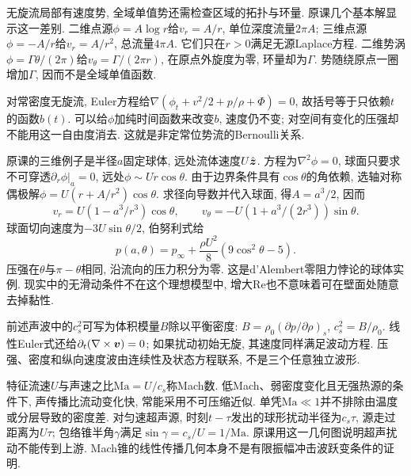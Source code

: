 无旋流局部有速度势, 全域单值势还需检查区域的拓扑与环量. 原课几个基本解显示这一差别. 二维点源$\phi=A\log r$给$v_r=A/r$, 单位深度流量$2\pi A$; 三维点源$\phi=-A/r$给$v_r=A/r^2$, 总流量$4\pi A$. 它们只在$r>0$满足无源Laplace方程. 二维势涡$\phi=\Gamma\theta/(2\pi)$给$v_\theta=\Gamma/(2\pi r)$, 在原点外旋度为零, 环量却为$\Gamma$. 势随绕原点一圈增加$\Gamma$, 因而不是全域单值函数.

对常密度无旋流, Euler方程给$\nabla(\phi_t+v^2/2+p/\rho+\Phi)=0$, 故括号等于只依赖$t$的函数$b(t)$. 可以给$\phi$加纯时间函数来改变$b$, 速度仍不变; 对空间有变化的压强却不能用这一自由度消去. 这就是非定常位势流的Bernoulli关系.

原课的三维例子是半径$a$固定球体, 远处流体速度$U\hat{\boldsymbol{z}}$. 方程为$\nabla^2\phi=0$, 球面只要求不可穿透$\partial_r\phi|_a=0$, 远处$\phi\sim Ur\cos\theta$. 由于边界条件具有$\cos\theta$的角依赖, 选轴对称偶极解$\phi=U(r+A/r^2)\cos\theta$. 求径向导数并代入球面, 得$A=a^3/2$, 因而
\[
v_r=U(1-a^3/r^3)\cos\theta,\qquad
v_\theta=-U(1+a^3/(2r^3))\sin\theta.
\]
球面切向速度为$-3U\sin\theta/2$, 伯努利式给
\[
p(a,\theta)=p_\infty+\frac{\rho U^2}{8}(9\cos^2\theta-5).
\]
压强在$\theta$与$\pi-\theta$相同, 沿流向的压力积分为零. 这是d'Alembert零阻力悖论的球体实例. 现实中的无滑动条件不在这个理想模型中, 增大Re也不意味着可在壁面处随意去掉黏性.

前述声波中的$c_s^2$可写为体积模量$B$除以平衡密度: $B=\rho_0(\partial p/\partial\rho)_s$, $c_s^2=B/\rho_0$. 线性Euler式还给$\partial_t(\nabla\times\boldsymbol{v})=0$; 如果扰动初始无旋, 其速度同样满足波动方程. 压强、密度和纵向速度波由连续性及状态方程联系, 不是三个任意独立波形.

特征流速$U$与声速之比$\mathrm{Ma}=U/c_s$称Mach数. 低Mach、弱密度变化且无强热源的条件下, 声传播比流动变化快, 常能采用不可压缩近似. 单凭$\mathrm{Ma}\ll1$并不排除由温度或分层导致的密度差. 对匀速超声源, 时刻$t-\tau$发出的球形扰动半径为$c_s\tau$, 源走过距离为$U\tau$; 包络锥半角$\gamma$满足$\sin\gamma=c_s/U=1/\mathrm{Ma}$. 原课用这一几何图说明超声扰动不能传到上游. Mach锥的线性传播几何本身不是有限振幅冲击波跃变条件的证明.
